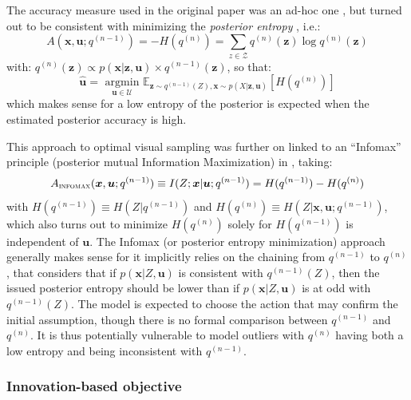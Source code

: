 \documentclass[12pt,twoside,openright]{article}
\begin{document}
The accuracy measure used in the original paper was an ad-hoc one \citep{najemnik2005optimal}, but turned out to be consistent with minimizing the \emph{posterior entropy} \citep{najemnik2009simple}, i.e.:
$$A(\boldsymbol{x}, \boldsymbol{u}; q^{(n-1)}) = -H(q^{(n)}) = \sum_{z \in \mathcal{Z}} q^{(n)}(\boldsymbol{z}) \log q^{(n)}(\boldsymbol{z})$$
with: $q^{(n)}(\boldsymbol{z}) \propto p(\boldsymbol{x|\boldsymbol{z}, \boldsymbol{u}}) \times q^{(n-1)}(\boldsymbol{z}) $,
so that:
$$\hat{\boldsymbol{u}} = \underset{\boldsymbol{u} \in \mathcal{U}}{\text{ argmin }} \mathbb{E}_{\boldsymbol{z} \sim q^{(n-1)}(Z), \boldsymbol{x} \sim p(X|\boldsymbol{z}, \boldsymbol{u})}\left[H(q^{(n)})\right] $$ 
which makes sense for a low entropy of the posterior is expected when the estimated posterior accuracy is high.


This approach to optimal visual sampling was further on linked to an ``Infomax'' principle {\color{Purple} (posterior mutual Information Maximization)} in \citet{butko2010infomax}, 
taking:
\begin{align}A_\text{\sc infomax}(\boldsymbol{x}, \boldsymbol{u}; q^{(n-1)}) \equiv I(Z; \boldsymbol{x}|\boldsymbol{u}; q^{(n-1)})
= H(q^{(n-1)}) - H(q^{(n)})
\label{eq:infomax}
\end{align}
with  $H(q^{(n-1)}) \equiv H(Z|q^{(n-1)})$ and $H(q^{(n)}) \equiv H(Z|\boldsymbol{x}, \boldsymbol{u}; q^{(n-1)})$, {\color{Purple} which also turns out to minimize $H(q^{(n)})$ solely for $H(q^{(n-1)})$ is independent of $\boldsymbol{u}$}.
The Infomax (or posterior entropy minimization) approach generally makes sense for it implicitly relies on the chaining from $q^{(n-1)}$ to $q^{(n)}$, that considers that if $p(\boldsymbol{x}|Z, \boldsymbol{u})$ is consistent with $q^{(n-1)}(Z)$, then the issued posterior entropy should be lower than if $p(\boldsymbol{x}|Z, \boldsymbol{u})$ is at odd with $q^{(n-1)}(Z)$. The model is expected to choose the action that may confirm the initial assumption, though there is no formal comparison between $q^{(n-1)}$ and $q^{(n)}$.
It is thus potentially vulnerable to model outliers with $q^{(n)}$ having both a low entropy and being inconsistent with $q^{(n-1)}$.

\subsubsection{Innovation-based objective}\label{sec:saliency}
\end{document}

